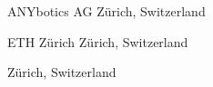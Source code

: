 \cvtitlecontentspacing
\vspace{-.3mm}
\begin{cventries}

  \cventry
    {\CVAnyTitle}
    {ANYbotics AG}
    {Zürich, Switzerland}
    {\AnyDates}
    {
      \begin{cvitems}
        \item {\CVAnyOne}
        \item {\CVAnyTwo}
        \item {\CVAnyThree}
        \item {\CVAnyFour}
        \ifdefempty{\CVAnyFive}{}{\item {\CVAnyFive}}
        \ifdefempty{\CVAnySix}{}{\item {\CVAnySix}}
      \end{cvitems}
    }

  \cventry
    {\CVETHDisplayTitle}
    {ETH Zürich}
    {Zürich, Switzerland}
    {\ETHDoctoralDates}
    {
      \begin{cvitems}
        \item {\CVETHOne}
        \item {\CVETHTwo}
        \item {\CVETHThree}
        \ifdefempty{\CVETHFour}{}{\item {\CVETHFour}}
      \end{cvitems}
    }

  \ifCVIncludeDisney
    \cventry
      {\CVDisneyDisplayTitle}
      {\CVDisneyOrganization}
      {Zürich, Switzerland}
      {\DisneyDates}
      {
        \begin{cvitems}
          \item {\CVDisneyOne}
          \item {\CVDisneyTwo}
        \end{cvitems}
      }
  \fi
\end{cventries}
